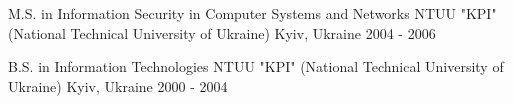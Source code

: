

\begin{cventries}

  \cventry
    {M.S. in Information Security in Computer Systems and Networks} %
    {NTUU "KPI" (National Technical University of Ukraine)} %
    {Kyiv, Ukraine} %
    {2004 - 2006} %
    {
    }

  \cventry
    {B.S. in Information Technologies} %
    {NTUU "KPI" (National Technical University of Ukraine)} %
    {Kyiv, Ukraine} %
    {2000 - 2004} %
    {
    }

\end{cventries}

